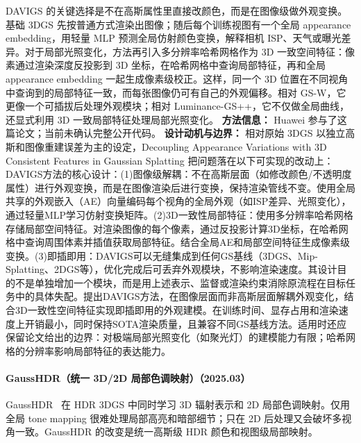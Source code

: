 DAVIGS 的关键选择是不在高斯属性里直接改颜色，而是在图像级做外观变换。基础 3DGS 先按普通方式渲染出图像；随后每个训练视图有一个全局 appearance embedding，用轻量 MLP 预测全局仿射颜色变换，解释相机 ISP、天气或曝光差异。对于局部光照变化，方法再引入多分辨率哈希网格作为 3D 一致空间特征：像素通过渲染深度反投影到 3D 坐标，在哈希网格中查询局部特征，再和全局 appearance embedding 一起生成像素级校正。这样，同一个 3D 位置在不同视角中查询到的局部特征一致，而每张图像仍可有自己的外观偏移。相对 GS-W，它更像一个可插拔后处理外观模块；相对 Luminance-GS++，它不仅做全局曲线，还显式利用 3D 一致局部特征处理局部光照变化。
\textbf{方法信息：} Huawei 参与了这篇论文；当前未确认完整公开代码。
\textbf{设计动机与边界：} 相对原始 3DGS 以独立高斯和图像重建误差为主的设定，Decoupling Appearance Variations with 3D Consistent Features in Gaussian Splatting 把问题落在以下可实现的改动上：DAVIGS方法的核心设计：(1)图像级解耦：不在高斯层面（如修改颜色/不透明度属性）进行外观变换，而是在图像渲染后进行变换，保持渲染管线不变。使用全局共享的外观嵌入（AE）向量编码每个视角的全局外观（如ISP差异、光照变化），通过轻量MLP学习仿射变换矩阵。(2)3D一致性局部特征：使用多分辨率哈希网格存储局部空间特征。对渲染图像的每个像素，通过反投影计算3D坐标，在哈希网格中查询周围体素并插值获取局部特征。结合全局AE和局部空间特征生成像素级变换。(3)即插即用：DAVIGS可以无缝集成到任何GS基线（3DGS、Mip-Splatting、2DGS等），优化完成后可丢弃外观模块，不影响渲染速度。其设计目的不是单独增加一个模块，而是用上述表示、监督或渲染约束消除原流程在目标任务中的具体失配。提出DAVIGS方法，在图像层面而非高斯层面解耦外观变化，结合3D一致性空间特征实现即插即用的外观建模。在训练时间、显存占用和渲染速度上开销最小，同时保持SOTA渲染质量，且兼容不同GS基线方法。适用时还应保留论文给出的边界：对极端局部光照变化（如聚光灯）的建模能力有限；哈希网格的分辨率影响局部特征的表达能力。
\paragraph{GaussHDR（统一 3D/2D 局部色调映射）（2025.03）}
GaussHDR~\cite{2503_10143} 在 HDR 3DGS 中同时学习 3D 辐射表示和 2D 局部色调映射。仅用全局 tone mapping 很难处理局部高亮和暗部细节；只在 2D 后处理又会破坏多视角一致。GaussHDR 的改变是统一高斯级 HDR 颜色和视图级局部映射。

